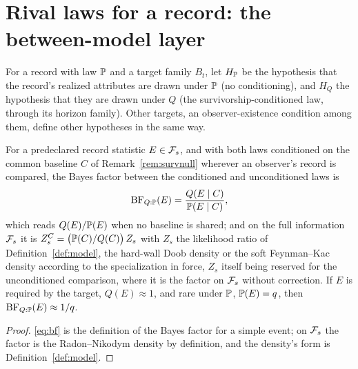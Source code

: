 \section{Rival laws for a record: the between-model layer}
\label{sec:models}

\begin{definition}\label{def:hyps}
For a record with law $\mathbb{P}$ and a target family $B_t$, let $H_{\mathbb{P}}$ be the
hypothesis that the record's realized attributes are drawn under $\mathbb{P}$
(no conditioning), and $H_Q$ the hypothesis that they are drawn under
$Q$ (the survivorship-conditioned law, through its horizon family). Other
targets, an observer-existence condition among them, define other
hypotheses in the same way.
\end{definition}

\begin{proposition}\label{prop:bf}
For a predeclared record statistic $E\in\mathcal{F}_s$, and with both laws
conditioned on the common baseline $C$ of Remark~\ref{rem:survnull}
wherever an observer's record is compared, the Bayes factor between the
conditioned and unconditioned laws is
\begin{equation}\label{eq:bf}
\mathrm{BF}_{Q:\mathbb{P}}(E)=\frac{Q(E\mid C)}{\mathbb{P}(E\mid C)},
\end{equation}
which reads $Q(E)/\mathbb{P}(E)$ when no baseline is shared;
and on the full information $\mathcal{F}_s$ it is $Z^{C}_s = \bigl(\mathbb{P}(C)/Q(C)\bigr)\, Z_s$ with $Z_s$ the likelihood ratio of Definition~\ref{def:model}, the hard-wall Doob density or the soft Feynman--Kac density according to the specialization in force, $Z_s$ itself being reserved for the unconditioned comparison, where it is the factor on $\mathcal{F}_s$ without correction. If $E$ is required by the
target, $Q(E)\approx1$, and rare under $\mathbb{P}$, $\mathbb{P}(E)=q$, then
$\mathrm{BF}_{Q:\mathbb{P}}(E)\approx1/q$.
\end{proposition}

\begin{proof}
\eqref{eq:bf} is the definition of the Bayes factor for a simple event;
on $\mathcal{F}_s$ the factor is the Radon--Nikodym density by definition, and the
density's form is Definition~\ref{def:model}.
\end{proof}

